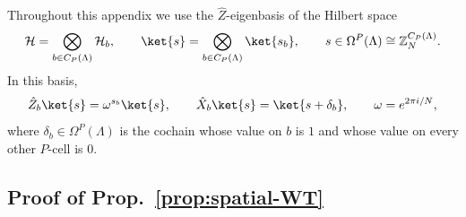 \documentclass[dvipsnames,a4paper]{article}
\numberwithin{equation}{section}
\theoremstyle{definition}
\theoremstyle{remark}
\begin{document}
Throughout this appendix we use the \(\hat Z\)-eigenbasis of the Hilbert space
\begin{equation}
	\mathcal H=\bigotimes_{b\in C_P(\Lambda)}\mathcal H_b,
	\qquad
	\ket{s}
	=
	\bigotimes_{b\in C_P(\Lambda)}\ket{s_b},
	\qquad
	s\in \Omega^P(\Lambda)\cong \mathbb Z_N^{C_P(\Lambda)}.
\end{equation}
In this basis,
\begin{equation}
	\hat Z_b\ket{s}=\omega^{s_b}\ket{s},
	\qquad
	\hat X_b\ket{s}
	=
	\ket{s+\delta_b},
	\qquad
	\omega=e^{2\pi i/N},
	\label{eq:Z-basis}
\end{equation}
where \(\delta_b\in \Omega^P(\Lambda)\) is the cochain whose value on \(b\) is \(1\) and
whose value on every other \(P\)-cell is \(0\).



\subsection{Proof of Prop.~\ref{prop:spatial-WT}}\label{app:WTalgebra}
\end{document}
